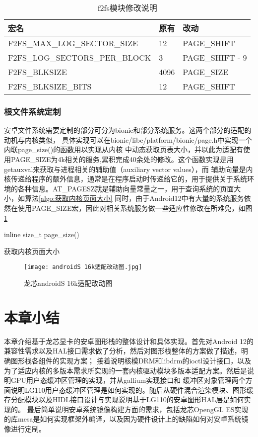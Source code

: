 \begin{table}[h]
  \centering
  \caption{f2fs模块修改说明}
  \label{tab:f2fs模块修改说明}
  \begin{tabular}{lll}
    \toprule
    宏名   &   原有  &改动  \\
    \midrule
    F2FS\_MAX\_LOG\_SECTOR\_SIZE & 12 & PAGE\_SHIFT \\
    F2FS\_LOG\_SECTORS\_PER\_BLOCK & 3 & PAGE\_SHIFT - 9 \\
    F2FS\_BLKSIZE & 4096 & PAGE\_SIZE \\
    F2FS\_BLKSIZE\_BITS & 12 & PAGE\_SHIFT \\
    \bottomrule
  \end{tabular}
  \note{}
\end{table}

\subsubsection{根文件系统定制}
安卓文件系统需要定制的部分可分为bionic和部分系统服务。这两个部分的适配的动机与内核类似，
具体实现可以在bionic/libc/platform/bionic/page.h中实现一个内联page\_size()的函数用以实现从内核
中动态获取页表大小，并以此为适配有使用PAGE\_SIZE为4k相关的服务,累积完成40余处的修改。这个函数实现是用getauxval来获取与进程相关的辅助值（auxiliary vector values），而
辅助向量是内核传递给程序的额外信息，通常是在程序启动时传递给它的，用于提供关于系统环境的各种信息。AT\_PAGESZ就是辅助向量常量之一，用于查询系统的页面大小，如算法\ref{algo:获取内核页面大小}
同时，由于Android12中有大量的系统服务依然在使用PAGE\_SIZE宏，因此对相关系统服务做一些适应性修改在所难免，如图\ref{fig:androidS 16k适配改动图}
\begin{algorithm}[H]
  \SetAlgoLined
  inline size\_t page\_size(){\\
  }
  \caption{获取内核页面大小}
  \label{algo:获取内核页面大小}
\end{algorithm}

\begin{figure}[h]
  \centering
  \texttt{[image: androidS 16k适配改动图.jpg]}
  \caption{龙芯androidS 16k适配改动图}
  \label{fig:androidS 16k适配改动图}
\end{figure}


\section{本章小结}
本章介绍基于龙芯显卡的安卓图形栈的整体设计和具体实现。首先对Android 12的兼容性需求以及HAL接口需求做了分析，然后对图形栈整体的方案做了描述，明确图形栈各组件的实现方案；
接着说明核模DRM和libdrm的ioctl设计接口，以及为了适应内核的多版本需求所实现的一套内核驱动模块多版本适配方案。然后是说明GPU用户态缓冲区管理的实现，并从gallium实现接口和
缓冲区对象管理两个方面说明LG110用户态缓冲区管理是如何实现的。随后从硬件混合渲染模块、图形缓存分配模块以及HIDL接口设计与实现说明基于LG110的安卓图形HAL层是如何实现的。
最后简单说明安卓系统镜像构建方面的需求，包括龙芯OpengGL ES实现的库mesa是如何实现框架外编译，以及因为硬件设计上的缺陷如何对安卓系统镜像进行定制。

